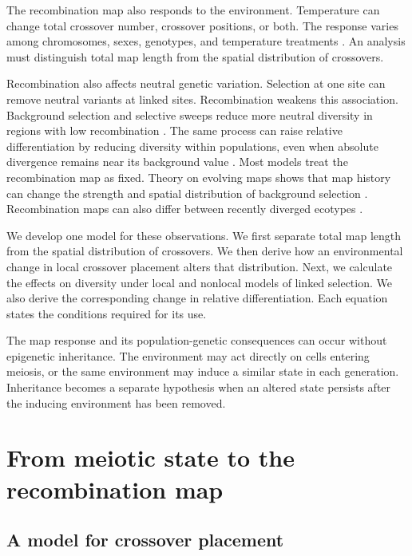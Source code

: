 \documentclass[11pt]{article}
\theoremstyle{remark}
\begin{document}
The recombination map also responds to the environment. Temperature can change
total crossover number, crossover positions, or both. The response varies among
chromosomes, sexes, genotypes, and temperature treatments
\citep{lloyd2018,modliszewski2018,destorme2020,coulton2020}. An analysis must distinguish total map length from the spatial distribution of
crossovers.

Recombination also affects neutral genetic variation. Selection at one site can
remove neutral variants at linked sites. Recombination weakens this association.
Background selection and selective sweeps reduce more neutral diversity
in regions with low recombination
\citep{begun1992,charlesworth1993,hudson1995,nordborg1996,coop2012}. The same
process can raise relative differentiation by reducing diversity within
populations, even when absolute divergence remains near its background value
\citep{charlesworth1998,cruickshank2014}. Most models treat the recombination map
as fixed. Theory on evolving maps shows that map history can change the strength
and spatial distribution of background selection \citep{booker2022}. Recombination
maps can also differ between recently diverged ecotypes \citep{talbi2025}.

We develop one model for these observations. We first separate total map length
from the spatial distribution of crossovers. We then derive how an environmental
change in local crossover placement alters that distribution. Next, we calculate
the effects on diversity under local and nonlocal models of linked selection. We
also derive the corresponding change in relative differentiation. Each equation
states the conditions required for its use.

The map response and its population-genetic consequences can occur without
epigenetic inheritance. The environment may act directly on cells entering meiosis,
or the same environment may induce a similar state in each generation. Inheritance becomes a separate hypothesis when
an altered state persists after the inducing environment has been removed.

\section{From meiotic state to the recombination map}
\label{sec:model}

\subsection{A model for crossover placement}
\end{document}
